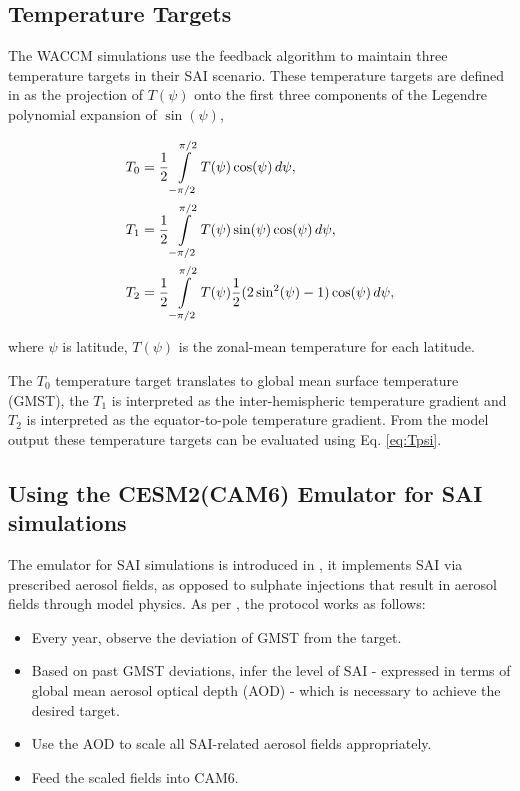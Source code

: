 \subsection{Temperature Targets}\label{temptargets}
The WACCM simulations use the feedback algorithm to maintain three temperature targets in their SAI scenario. These temperature targets are defined in \textcite{kravitz2016} as the projection of $T(\psi)$ onto the first three components of the Legendre polynomial expansion of $\sin(\psi)$,

\begin{equation}\label{eq:Tpsi}
    \begin{split}
        T_0 &= \frac{1}{2} \int\displaylimits_{-\pi/2}^{\pi/2} T(\psi) \cos(\psi) \mathop{d\psi},\\
        T_1 &= \frac{1}{2} \int\displaylimits_{-\pi/2}^{\pi/2} T(\psi) \sin(\psi) \cos(\psi) \mathop{d\psi},\\
        T_2 &= \frac{1}{2} \int\displaylimits_{-\pi/2}^{\pi/2} T(\psi) \frac{1}{2}(2\sin^2(\psi) -1) \cos(\psi) \mathop{d\psi},
    \end{split}
\end{equation}

\noindent where $\psi$ is latitude, $T(\psi)$ is the zonal-mean temperature for each latitude.

The $T_0$ temperature target translates to global mean surface temperature (GMST), the $T_1$ is interpreted as the inter-hemispheric temperature gradient and $T_2$ is interpreted as the equator-to-pole temperature gradient. From the model output these temperature targets can be evaluated using Eq. \ref{eq:Tpsi}. 


\subsection{Using the CESM2(CAM6) Emulator for SAI simulations}\label{emulator_pt1}
The emulator for SAI simulations is introduced in \textcite{pfluger2024}, it implements SAI via prescribed aerosol fields, as opposed to sulphate injections that result in aerosol fields through model physics. As per \textcite{pfluger2024}, the protocol works as follows:
\begin{itemize}
    \item Every year, observe the deviation of GMST from the target.
    \item Based on past GMST deviations, infer the level of SAI - expressed in terms of global mean aerosol optical depth (AOD) - which is necessary to achieve the desired target.
    \item Use the AOD to scale all SAI-related aerosol fields appropriately.
    \item Feed the scaled fields into CAM6.
\end{itemize}

